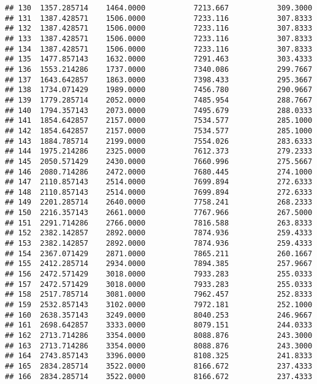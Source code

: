 \documentclass[]{article}
\begin{document}
\begin{verbatim}
## 130  1357.285714    1464.0000           7213.667           309.3000
## 131  1387.428571    1506.0000           7233.116           307.8333
## 132  1387.428571    1506.0000           7233.116           307.8333
## 133  1387.428571    1506.0000           7233.116           307.8333
## 134  1387.428571    1506.0000           7233.116           307.8333
## 135  1477.857143    1632.0000           7291.463           303.4333
## 136  1553.214286    1737.0000           7340.086           299.7667
## 137  1643.642857    1863.0000           7398.433           295.3667
## 138  1734.071429    1989.0000           7456.780           290.9667
## 139  1779.285714    2052.0000           7485.954           288.7667
## 140  1794.357143    2073.0000           7495.679           288.0333
## 141  1854.642857    2157.0000           7534.577           285.1000
## 142  1854.642857    2157.0000           7534.577           285.1000
## 143  1884.785714    2199.0000           7554.026           283.6333
## 144  1975.214286    2325.0000           7612.373           279.2333
## 145  2050.571429    2430.0000           7660.996           275.5667
## 146  2080.714286    2472.0000           7680.445           274.1000
## 147  2110.857143    2514.0000           7699.894           272.6333
## 148  2110.857143    2514.0000           7699.894           272.6333
## 149  2201.285714    2640.0000           7758.241           268.2333
## 150  2216.357143    2661.0000           7767.966           267.5000
## 151  2291.714286    2766.0000           7816.588           263.8333
## 152  2382.142857    2892.0000           7874.936           259.4333
## 153  2382.142857    2892.0000           7874.936           259.4333
## 154  2367.071429    2871.0000           7865.211           260.1667
## 155  2412.285714    2934.0000           7894.385           257.9667
## 156  2472.571429    3018.0000           7933.283           255.0333
## 157  2472.571429    3018.0000           7933.283           255.0333
## 158  2517.785714    3081.0000           7962.457           252.8333
## 159  2532.857143    3102.0000           7972.181           252.1000
## 160  2638.357143    3249.0000           8040.253           246.9667
## 161  2698.642857    3333.0000           8079.151           244.0333
## 162  2713.714286    3354.0000           8088.876           243.3000
## 163  2713.714286    3354.0000           8088.876           243.3000
## 164  2743.857143    3396.0000           8108.325           241.8333
## 165  2834.285714    3522.0000           8166.672           237.4333
## 166  2834.285714    3522.0000           8166.672           237.4333

\end{verbatim}
\end{document}
